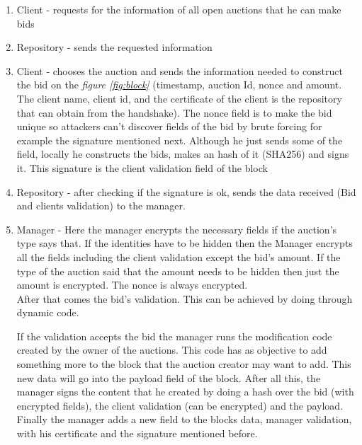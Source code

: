 \documentclass[12pt]{article}
\begin{document}
\begin{enumerate}
    \item Client - requests for the information of all open auctions that he can make bids

    \item Repository - sends the requested information

    \item Client - chooses the auction and sends the information needed to construct the bid on the 
      \textit{figure \ref{fig:block}} (timestamp, auction Id, nonce and amount. The client name, client id, 
      and the certificate of the client is the repository that can obtain from the handshake). The nonce
      field is to make the bid unique so attackers can't discover fields of the bid by brute forcing
      for example the signature mentioned next. Although he just sends some of the field, locally he constructs the 
      bids, makes an hash of it (SHA256) and signs it. This signature is the client validation field of the block

    \item Repository - after checking if the signature is ok, sends the data received (Bid and clients validation)
      to the manager.

    \item Manager - Here the manager encrypts the necessary fields if the auction's type says that. 
    \label{itm:bidvalidation}
      If the identities have to be hidden then the Manager encrypts all the fields including the client validation except the 
      bid's amount. If the type of the auction said that the amount needs to be hidden then just the 
      amount is encrypted. The nonce is always encrypted. \\
      After that comes the bid's validation. This can be achieved by doing through dynamic code. 

      If the validation accepts the bid the manager runs the modification code created by the owner 
        of the auctions. This code has as objective to add something more to the block that the auction 
        creator may want to add. This new data will go into the payload field of the block.
      After all this, the manager signs the content that he created by doing a hash over the bid (with 
        encrypted fields), the client validation (can be encrypted) and the payload. Finally the manager 
        adds a new field to the blocks data, manager validation, with his certificate and the signature 
        mentioned before.


\end{enumerate}
\end{document}
